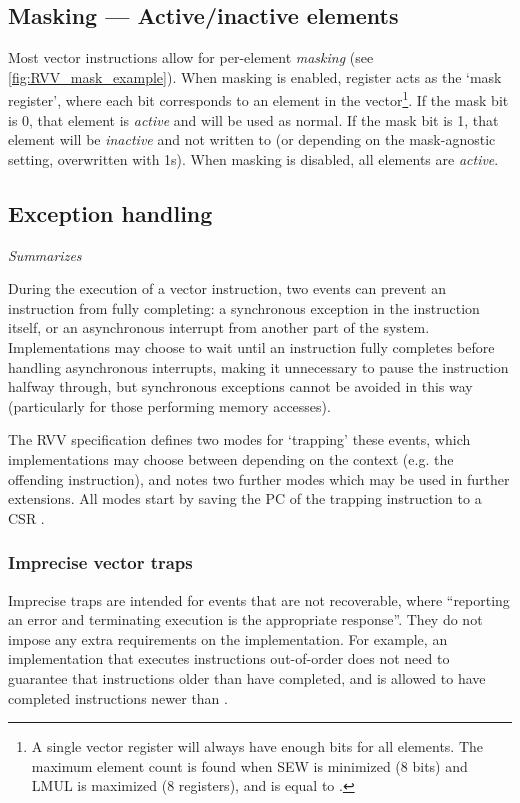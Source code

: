 \subsection{Masking --- Active/inactive elements}\label{chap:bg:subsec:rvvmasking}
Most vector instructions allow for per-element \emph{masking} (see \cref{fig:RVV_mask_example}).
When masking is enabled, register  acts as the `mask register', where each bit corresponds to an element in the vector\footnote{A single vector register will always have enough bits for all elements. The maximum element count is found when SEW is minimized (8 bits) and LMUL is maximized (8 registers), and is equal to .}.
If the mask bit is 0, that element is \emph{active} and will be used as normal.
If the mask bit is 1, that element will be \emph{inactive} and not written to (or depending on the mask-agnostic setting, overwritten with 1s).
When masking is disabled, all elements are \emph{active}.

\pagebreak
\subsection{Exception handling}\label{chap:bg:subsec:vexceptions}
\emph{Summarizes \cite[Section 17]{specification-RVV-v1.0}}

During the execution of a vector instruction, two events can prevent an instruction from fully completing: a synchronous exception in the instruction itself, or an asynchronous interrupt from another part of the system.
Implementations may choose to wait until an instruction fully completes before handling asynchronous interrupts, making it unnecessary to pause the instruction halfway through, but synchronous exceptions cannot be avoided in this way (particularly for those performing memory accesses).

The RVV specification defines two modes for `trapping' these events, which implementations may choose between depending on the context (e.g. the offending instruction), and notes two further modes which may be used in further extensions.
All modes start by saving the PC of the trapping instruction to a CSR .

\subsubsection{Imprecise vector traps}
Imprecise traps are intended for events that are not recoverable, where \enquote{reporting an error and terminating execution is the appropriate response}.
They do not impose any extra requirements on the implementation.
For example, an implementation that executes instructions out-of-order does not need to guarantee that instructions older than  have completed, and is allowed to have completed instructions newer than .

